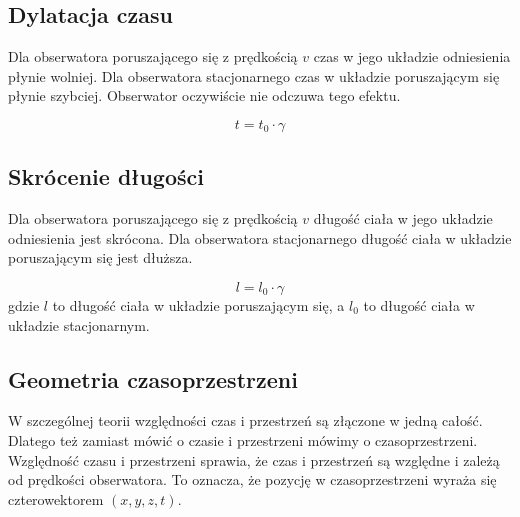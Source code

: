 \documentclass{../notatki}
\begin{document}
\subsection{Dylatacja czasu}

Dla obserwatora poruszającego się z prędkością $v$ czas w jego układzie
odniesienia płynie wolniej. Dla obserwatora stacjonarnego czas w układzie
poruszającym się płynie szybciej. Obserwator oczywiście nie odczuwa tego
efektu.

$$
t = t_0 \cdot \gamma
$$

\subsection{Skrócenie długości}

Dla obserwatora poruszającego się z prędkością $v$ długość ciała w jego
układzie odniesienia jest skrócona. Dla obserwatora stacjonarnego długość
ciała w układzie poruszającym się jest dłuższa.

$$
l = l_0 \cdot \gamma
$$
gdzie $l$ to długość ciała w układzie poruszającym się, a $l_0$ to długość
ciała w układzie stacjonarnym.

\subsection{Geometria czasoprzestrzeni}

W szczególnej teorii względności czas i przestrzeń są złączone w jedną
całość. Dlatego też zamiast mówić o czasie i przestrzeni mówimy o
czasoprzestrzeni.
Względność czasu i przestrzeni sprawia, że czas i przestrzeń są względne
i zależą od prędkości obserwatora. To oznacza, że pozycję w czasoprzestrzeni
wyraża się czterowektorem $(x, y, z, t)$.
\end{document}
